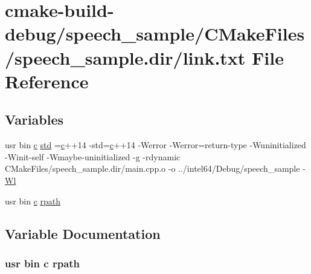\hypertarget{speech__sample_2CMakeFiles_2speech__sample_8dir_2link_8txt}{}\section{cmake-\/build-\/debug/speech\+\_\+sample/\+C\+Make\+Files/speech\+\_\+sample.dir/link.txt File Reference}
\label{speech__sample_2CMakeFiles_2speech__sample_8dir_2link_8txt}
\subsection*{Variables}
\begin{DoxyCompactItemize}
\item 
usr bin \hyperlink{CMakeCache_8txt_aac1d6a1710812201527c735f7c6afbaa}{c} \hyperlink{speech__sample_2CMakeFiles_2speech__sample_8dir_2link_8txt_a1ccfea5f558575a112db71eeb271fabf}{std} =\hyperlink{CMakeCache_8txt_aac1d6a1710812201527c735f7c6afbaa}{c}++14 -\/std=\hyperlink{CMakeCache_8txt_aac1d6a1710812201527c735f7c6afbaa}{c}++14 -\/Werror -\/Werror=return-\/type -\/Wuninitialized -\/Winit-\/self -\/Wmaybe-\/uninitialized -\/g -\/rdynamic C\+Make\+Files/speech\+\_\+sample.\+dir/main.\+cpp.\+o -\/o ../intel64/Debug/speech\+\_\+sample -\/\hyperlink{thirdparty_2extension_2CMakeFiles_2cpu__extension_8dir_2link_8txt_af9ccbf658ed2deb89d0d79f211e5b033}{Wl}
\item 
usr bin \hyperlink{CMakeCache_8txt_aac1d6a1710812201527c735f7c6afbaa}{c} \hyperlink{speech__sample_2CMakeFiles_2speech__sample_8dir_2link_8txt_ab9d7fd7120fafa2118a4e08c1df697c7}{rpath}
\end{DoxyCompactItemize}


\subsection{Variable Documentation}
\subsubsection[{\texorpdfstring{rpath}{rpath}}]{\setlength{\rightskip}{0pt plus 5cm}usr bin {\bf c} rpath}\hypertarget{speech__sample_2CMakeFiles_2speech__sample_8dir_2link_8txt_ab9d7fd7120fafa2118a4e08c1df697c7}{}\label{speech__sample_2CMakeFiles_2speech__sample_8dir_2link_8txt_ab9d7fd7120fafa2118a4e08c1df697c7}


